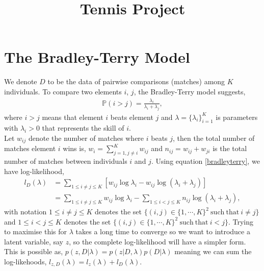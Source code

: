 \documentclass[11pt]{article}
\author{}
\title{Tennis Project}
\date{}
\numberwithin{equation}{section}
\begin{document}
\maketitle

\section{The Bradley-Terry Model}

We denote $D$ to be the data of pairwise comparisons (matches) among $K$ individuals. To compare two elements $i$, $j$, the Bradley-Terry model suggests, 
\begin{align} \label{bradleyterry}
\mathbb{P}(i >j) = \frac{\lambda_i}{\lambda_i + \lambda_j},
\end{align} 
where $i>j$ means that element $i$ beats element $j$ and $\lambda = \{\lambda_i\}_{i=1}^K$ is parameters with $\lambda_i >0$ that represents the skill of $i$. \\

Let $w_{ij}$ denote the number of matches where $i$ beats $j$, then the total number of matches element $i$ wins is, $w_i = \sum_{j=1, j \neq i}^K w_{ij}$ and $n_{ij} = w_{ij}+w_{ji}$ is the total number of matches between individuals $i$ and $j$. Using equation \ref{bradleyterry}, we have log-likelihood, 
\begin{align}
l_D(\lambda) &= \sum _{1 \leq i\neq j \leq K} [w_{ij}\log\lambda_i - w_{ij}\log(\lambda_i+\lambda_j)] \\
&= \sum _{1 \leq i\neq j \leq K} w_{ij}\log\lambda_i - \sum _{1 \leq i< j \leq K} n_{ij}\log(\lambda_i+\lambda_j),
\end{align}
with notation $1 \leq i\neq j \leq K$ denotes the set $\{(i,j) \in \{1,\cdots, K\}^2 \ \mathrm{such \ that} \ i\neq j \}$ and $1 \leq i<j \leq K$ denotes the set $\{(i,j) \in \{1,\cdots, K\}^2 \ \mathrm{such \ that} \ i<j \}$. Trying to maximise this for $\lambda$  takes a long time to converge so we want to introduce a latent variable, say $z$, so the complete log-likelihood will have a simpler form. This is possible as, $p(z,D|\lambda) = p(z|D,\lambda)p(D|\lambda)$ meaning we can sum the log-likehoods, $l_{z,D}(\lambda) = l_z(\lambda) + l_D(\lambda)$.\\
\end{document}
